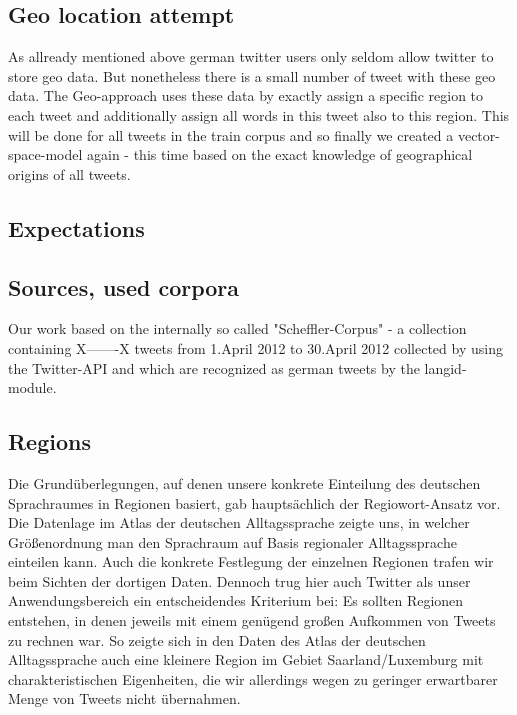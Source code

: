 \documentclass[../Main.tex]{subfiles}
\begin{document}
\subsection{Geo location attempt}
As allready mentioned above german twitter users only seldom allow twitter to store geo data. But nonetheless there is a small number of tweet with these geo data. The Geo-approach uses these data by exactly assign a specific region to each tweet and additionally assign all words in this tweet also to this region. This will be done for all tweets in the train corpus and so finally we created a vector-space-model again - this time based on the exact knowledge of geographical origins of all tweets. 
\subsection{Expectations}
\subsection{Sources, used corpora}
Our work based on the internally so called "Scheffler-Corpus" - a collection containing X-------X tweets from 1.April 2012 to 30.April 2012 collected by using the Twitter-API and which are recognized as german tweets by the langid-module.
\subsection{Regions}
Die Grundüberlegungen, auf denen unsere konkrete Einteilung des deutschen Sprachraumes in Regionen basiert, gab hauptsächlich der Regiowort-Ansatz vor. Die Datenlage im Atlas der deutschen Alltagssprache zeigte uns, in welcher Größenordnung man den Sprachraum auf Basis regionaler Alltagssprache einteilen kann. Auch die konkrete Festlegung der einzelnen Regionen trafen wir beim Sichten der dortigen Daten. Dennoch trug hier auch Twitter als unser Anwendungsbereich ein entscheidendes Kriterium bei: Es sollten Regionen entstehen, in denen jeweils mit einem genügend großen Aufkommen von Tweets zu rechnen war. So zeigte sich in den Daten des Atlas der deutschen Alltagssprache auch eine kleinere Region im Gebiet Saarland/Luxemburg mit charakteristischen Eigenheiten, die wir allerdings wegen zu geringer erwartbarer Menge von Tweets nicht übernahmen.
\end{document}

